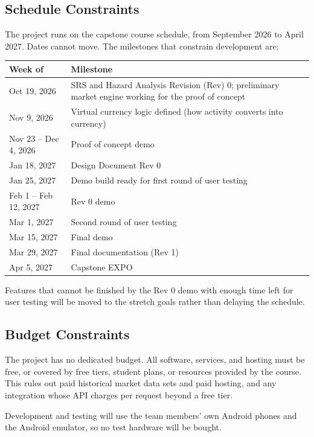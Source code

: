 \documentclass[12pt]{article}
\newcommand{\acr}[3]{\phantomsection\label{acr:#1}#2 (#3)}
\begin{document}
\subsection{Schedule Constraints}
\label{sec:schedule}

The project runs on the capstone course schedule, from September 2026 to April
2027. Dates cannot move. The milestones that constrain development are:

\begin{center}
\begin{tabularx}{\textwidth}{lX}
\toprule
\textbf{Week of} & \textbf{Milestone}\\
\midrule
Oct 19, 2026 & SRS and Hazard Analysis \acr{Rev}{Revision}{Rev} 0; preliminary market engine
working for the proof of concept\\
Nov 9, 2026 & Virtual currency logic defined (how activity converts into
currency)\\
Nov 23 -- Dec 4, 2026 & Proof of concept demo\\
Jan 18, 2027 & Design Document Rev 0\\
Jan 25, 2027 & Demo build ready for first round of user testing\\
Feb 1 -- Feb 12, 2027 & Rev 0 demo\\
Mar 1, 2027 & Second round of user testing\\
Mar 15, 2027 & Final demo\\
Mar 29, 2027 & Final documentation (Rev 1)\\
Apr 5, 2027 & Capstone EXPO\\
\bottomrule
\end{tabularx}
\end{center}

Features that cannot be finished by the Rev 0 demo with enough time left for
user testing will be moved to the stretch goals rather than delaying the
schedule.

\subsection{Budget Constraints}

The project has no dedicated budget. All software, services, and hosting must
be free, or covered by free tiers, student plans, or resources provided by the
course. This rules out paid historical market data sets and paid hosting, and
any integration whose API charges per request beyond a free tier.

Development and testing will use the team members' own Android phones and the
Android emulator, so no test hardware will be bought.
\end{document}
